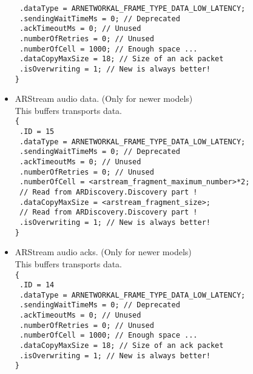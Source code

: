 \begin{itemize}
{    \texttt{  .dataType = ARNETWORKAL\_FRAME\_TYPE\_DATA\_LOW\_LATENCY;}\\
    \texttt{  .sendingWaitTimeMs = 0; // Deprecated}\\
    \texttt{  .ackTimeoutMs = 0; // Unused}\\
    \texttt{  .numberOfRetries = 0; // Unused}\\
    \texttt{  .numberOfCell = 1000; // Enough space ...}\\
    \texttt{  .dataCopyMaxSize = 18; // Size of an ack packet}\\
    \texttt{  .isOverwriting = 1; // New is always better!}\\
    \texttt{\}}
}
\item{
    ARStream audio data. (Only for newer models)\\
    This buffers transports  data.\\
    \texttt{\{}\\
    \texttt{  .ID = 15}\\
    \texttt{  .dataType = ARNETWORKAL\_FRAME\_TYPE\_DATA\_LOW\_LATENCY;}\\
    \texttt{  .sendingWaitTimeMs = 0; // Deprecated}\\
    \texttt{  .ackTimeoutMs = 0; // Unused}\\
    \texttt{  .numberOfRetries = 0; // Unused}\\
    \texttt{  .numberOfCell = <arstream\_fragment\_maximum\_number>*2;}\\
    \texttt{                  // Read from ARDiscovery.Discovery part !}\\
    \texttt{  .dataCopyMaxSize = <arstream\_fragment\_size>;}\\
    \texttt{                     // Read from ARDiscovery.Discovery part !}\\
    \texttt{  .isOverwriting = 1; // New is always better!}\\
    \texttt{\}}
}
\item{
    ARStream audio acks. (Only for newer models)\\
    This buffers transports  data.\\
    \texttt{\{}\\
    \texttt{  .ID = 14}\\
    \texttt{  .dataType = ARNETWORKAL\_FRAME\_TYPE\_DATA\_LOW\_LATENCY;}\\
    \texttt{  .sendingWaitTimeMs = 0; // Deprecated}\\
    \texttt{  .ackTimeoutMs = 0; // Unused}\\
    \texttt{  .numberOfRetries = 0; // Unused}\\
    \texttt{  .numberOfCell = 1000; // Enough space ...}\\
    \texttt{  .dataCopyMaxSize = 18; // Size of an ack packet}\\
    \texttt{  .isOverwriting = 1; // New is always better!}\\
    \texttt{\}}
}
\end{itemize}

